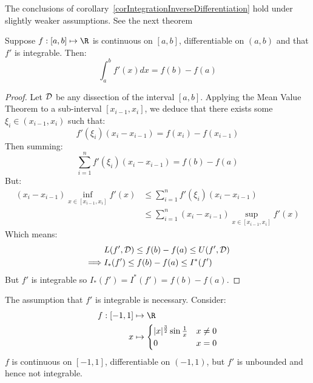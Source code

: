 \documentclass[../Main.tex]{subfiles}
\begin{document}
\begin{remark}
    The conclusions of corollary~\ref{corIntegrationInverseDifferentiation} hold under slightly weaker assumptions. See the next theorem
\end{remark}
\begin{theorem}
    Suppose $f : [a, b] \mapsto \R$ is continuous on $[a, b]$, differentiable on $(a, b)$ and that $f'$ is integrable. Then:
    \begin{equation*}
        \int_a^b f'(x) dx = f(b) - f(a)
    \end{equation*}
    \label{thmFundamentalCalculusII}
\end{theorem}
\begin{proof}
    Let $\mathcal{D}$ be any dissection of the interval $[a, b]$. Applying the Mean Value Theorem to a sub-interval $[x_{i - 1}, x_i]$, we deduce that there exists some $\xi_i \in (x_{i - 1}, x_i)$ such that:
    \begin{equation*}
        f'(\xi_i)(x_i - x_{i - 1}) = f(x_i) - f(x_{i - 1})
    \end{equation*}
    Then summing:
    \begin{equation*}
        \sum_{i = 1}^n f'(\xi_i)(x_i - x_{i - 1}) = f(b) - f(a)
    \end{equation*}
    But:
    \begin{align*}
        (x_i - x_{i - 1}) \inf_{x \in [x_{i - 1}, x_i]} f'(x) &\leq \sum_{i = 1}^n f'(\xi_i) (x_i - x_{i - 1}) \\
        &\leq \sum_{i = 1}^n (x_i - x_{i - 1}) \sup_{x \in [x_{i - 1}, x_i]} f'(x)
    \end{align*}
    Which means:
    \begin{align*}
        &L(f', \mathcal{D}) \leq f(b) - f(a) \leq U(f', \mathcal{D}) \\
        \implies &I_*(f') \leq f(b) - f(a) \leq I^*(f')
    \end{align*}
    But $f'$ is integrable so $I_*(f') = I^*(f') = f(b) - f(a)$.
\end{proof}
\begin{remark}
    The assumption that $f'$ is integrable is necessary. Consider:
    \begin{align*}
        f: [-1, 1] &\mapsto \R \\
        x &\mapsto
        \begin{cases}
            |x|^{\frac{3}{2}} \sin\frac{1}{x} & x \neq 0 \\
            0 & x = 0
        \end{cases}
    \end{align*}
    $f$ is continuous on $[-1, 1]$, differentiable on $(-1, 1)$, but $f'$ is unbounded and hence not integrable.
\end{remark}
\end{document}
